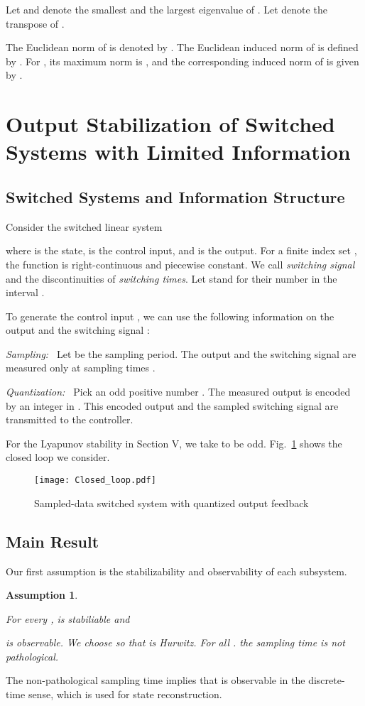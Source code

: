 \documentclass[letterpaper, 11pt, onecolumn]{ieeeconf}  \IEEEoverridecommandlockouts
\newtheorem{assumption}[theorem]{Assumption}
\begin{document}
Let  and  denote 
the smallest and the largest eigenvalue of .
Let  denote the transpose of .

The Euclidean norm of  is
denoted by . 
The Euclidean induced norm of  is defined by
.
For ,
its maximum norm is , and
the corresponding induced norm of  is given by
.



\section{Output Stabilization of Switched Systems with
Limited Information}
\subsection{Switched Systems and Information Structure}
Consider the switched linear system

where  is the state,
 is the control input, and
 is the output.
For a finite index set ,
the function  is right-continuous and
piecewise constant.
We call  {\em switching signal} and
the discontinuities of  {\em switching times}.
Let  stand for their number in the interval . 


To generate the control input , we can use
the following information on the output  and the switching signal :

{\sl Sampling:~}
Let  be the sampling period.
The output  and the switching signal  are measured only at
sampling times
 .

{\sl Quantization:~}
Pick an odd positive number .
The measured output  is encoded by an integer in
.
This encoded output and the sampled switching signal 
are transmitted to the controller.

For the Lyapunov stability in Section V, we take  to be odd.
Fig.~\ref{fig:SSSQOF} shows the closed loop we consider.
 \begin{figure}[tb]
 \centering
 \texttt{[image: Closed\_loop.pdf]}
 \caption{Sampled-data switched system with quantized output feedback}
 \label{fig:SSSQOF}
 \end{figure}


\subsection{Main Result}
Our first assumption is the stabilizability and observability of each subsystem.
\begin{assumption}
\label{ass:system}
{\em
For every ,  is stabiliable and

is observable.
We choose  so that
 is Hurwitz.
For all . 
the sampling time  is not pathological.
}
\end{assumption}
The non-pathological sampling time implies that
 is observable in the discrete-time sense,
which is used for state reconstruction.
\end{document}
